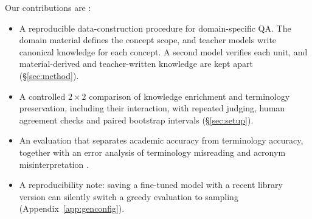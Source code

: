 Our contributions are :
\begin{itemize}
\item A reproducible data-construction procedure for domain-specific QA.
The domain material defines the concept scope, and teacher models write canonical knowledge for each concept.
A second model verifies each unit, and material-derived and teacher-written knowledge are kept apart (\S\ref{sec:method}).
\item A controlled $2\times2$ comparison of knowledge enrichment and terminology preservation, including their interaction, with repeated judging, human agreement checks and paired bootstrap intervals (\S\ref{sec:setup}).
\item An evaluation that separates academic accuracy from terminology accuracy, together with an error analysis of terminology misreading and acronym misinterpretation .
\item A reproducibility note: saving a fine-tuned model with a recent library version can silently switch a greedy evaluation to sampling (Appendix~\ref{app:genconfig}).
\end{itemize}
